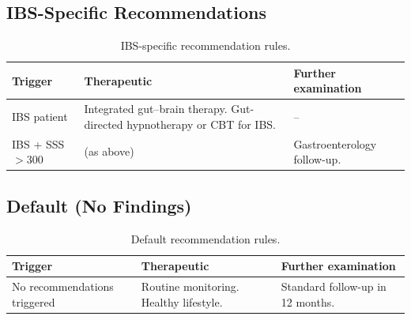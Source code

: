 \subsection{IBS-Specific Recommendations}

\begin{table}[H]
\centering
\caption{IBS-specific recommendation rules.}
\label{tab:rec-ibs}
\begin{tabular}{p{3.5cm}p{5.0cm}p{4.5cm}}
\toprule
\textbf{Trigger} & \textbf{Therapeutic} & \textbf{Further examination} \\
\midrule
IBS patient & Integrated gut--brain therapy. Gut-directed hypnotherapy or CBT for IBS. & -- \\
\addlinespace
IBS + SSS $> 300$ & (as above) & Gastroenterology follow-up. \\
\bottomrule
\end{tabular}
\end{table}

\subsection{Default (No Findings)}

\begin{table}[H]
\centering
\caption{Default recommendation rules.}
\label{tab:rec-default}
\begin{tabular}{p{3.5cm}p{5.0cm}p{4.5cm}}
\toprule
\textbf{Trigger} & \textbf{Therapeutic} & \textbf{Further examination} \\
\midrule
No recommendations triggered & Routine monitoring. Healthy lifestyle. & Standard follow-up in 12 months. \\
\bottomrule
\end{tabular}
\end{table}
